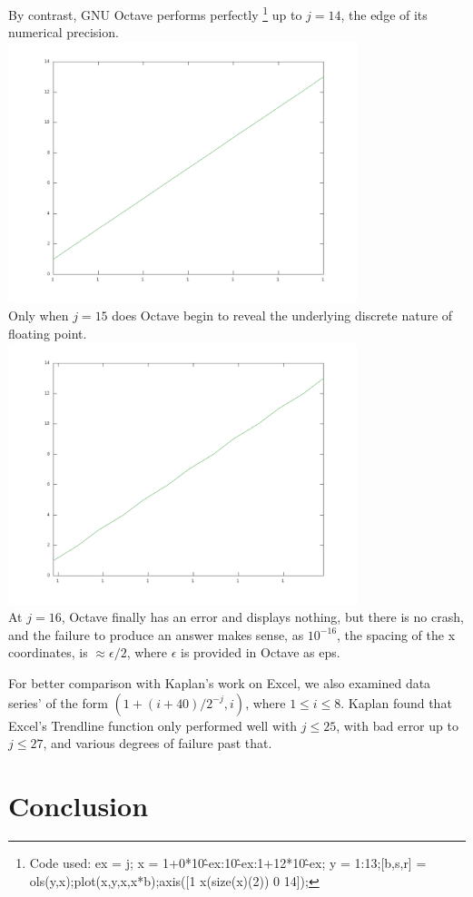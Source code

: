 \documentclass{article}
\begin{document}
By contrast, GNU Octave performs perfectly
\footnote{Code used: ex = j; x = 1+0*10\^-ex:10\^-ex:1+12*10\^-ex; y = 1:13;[b,s,r] = ols(y,x);plot(x,y,x,x*b);axis([1 x(size(x)(2)) 0 14]);}
up to $j=14$, the edge of its numerical precision.\\
\includegraphics[width=4in]{TRENDocj14.png}\\
\newpage
Only when $j=15$ does Octave begin to reveal the underlying discrete nature of floating point.\\
\includegraphics[width=4in]{TRENDocj15.png}\\
At $j=16$, Octave finally has an error and displays nothing, but there is no crash, and 
the failure to produce an answer makes sense, as $10^{-16}$, the spacing of the x coordinates,
is $\approx \epsilon/2$, where $\epsilon$ is provided in Octave as eps.

For better comparison with Kaplan's work on Excel, we also examined data series'
of the form ${(1 + (i + 40)/2^{-j}, i)}$, where $1\le i \le 8$.
Kaplan found that Excel's Trendline function only performed well with $j \le 25$,
with bad error up to $j \le 27$, and various degrees of failure past that.


\section*{Conclusion}
\end{document}
